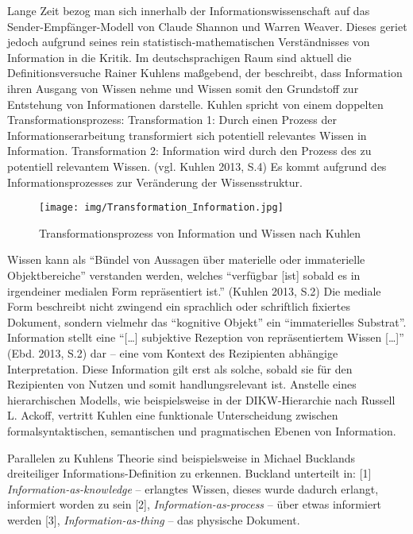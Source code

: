 \documentclass[a4paper,
fontsize=11pt,
oneside,
numbers=noperiodatend,
parskip=half-,
bibliography=totoc,
final
]{scrartcl}
\begin{document}
Lange Zeit bezog man sich innerhalb der Informationswissenschaft auf das
Sender-Empfänger-Modell von Claude Shannon und Warren Weaver. Dieses
geriet jedoch aufgrund seines rein statistisch-mathematischen
Verständnisses von Information in die Kritik. Im deutschsprachigen Raum
sind aktuell die Definitionsversuche Rainer Kuhlens maßgebend, der
beschreibt, dass Information ihren Ausgang von Wissen nehme und Wissen
somit den Grundstoff zur Entstehung von Informationen darstelle. Kuhlen
spricht von einem doppelten Transformationsprozess: Transformation 1:
Durch einen Prozess der Informationserarbeitung transformiert sich
potentiell relevantes Wissen in Information. Transformation 2:
Information wird durch den Prozess des zu potentiell relevantem Wissen.
(vgl. Kuhlen 2013, S.4) Es kommt aufgrund des Informationsprozesses zur
Veränderung der Wissensstruktur.

\begin{figure}
\centering
\texttt{[image: img/Transformation\_Information.jpg]}
\caption{Transformationsprozess von Information und Wissen nach Kuhlen}
\end{figure}

Wissen kann als \enquote{Bündel von Aussagen über materielle oder
immaterielle Objektbereiche} verstanden werden, welches
\enquote{verfügbar {[}ist{]} sobald es in irgendeiner medialen Form
repräsentiert ist.} (Kuhlen 2013, S.2) Die mediale Form beschreibt nicht
zwingend ein sprachlich oder schriftlich fixiertes Dokument, sondern
vielmehr das \enquote{kognitive Objekt} ein \enquote{immaterielles
Substrat}. Information stellt eine \enquote{{[}\ldots{}{]} subjektive
Rezeption von repräsentiertem Wissen {[}\ldots{}{]}} (Ebd. 2013, S.2)
dar -- eine vom Kontext des Rezipienten abhängige Interpretation. Diese
Information gilt erst als solche, sobald sie für den Rezipienten von
Nutzen und somit handlungsrelevant ist. Anstelle eines hierarchischen
Modells, wie beispielsweise in der DIKW-Hierarchie nach Russell L.
Ackoff, vertritt Kuhlen eine funktionale Unterscheidung zwischen
formalsyntaktischen, semantischen und pragmatischen Ebenen von
Information.

Parallelen zu Kuhlens Theorie sind beispielsweise in Michael Bucklands
dreiteiliger In\-for\-ma\-ti\-ons-Definition zu erkennen. Buckland unterteilt
in: {[}1{]} \emph{Information-as-knowledge} -- erlangtes Wissen, dieses
wurde dadurch erlangt, informiert worden zu sein {[}2{]},
\emph{Information-as-process} -- über etwas informiert werden {[}3{]},
\emph{Information-as-thing} -- das physische Dokument.
\end{document}
